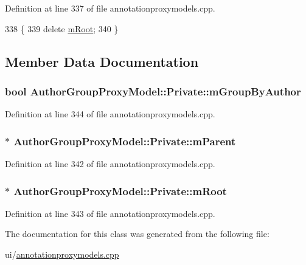 Definition at line 337 of file annotationproxymodels.\+cpp.


\begin{DoxyCode}
338         \{
339             \textcolor{keyword}{delete} \hyperlink{classAuthorGroupProxyModel_1_1Private_ac1023558be5adf141219d8be245ba47d}{mRoot};
340         \}
\end{DoxyCode}


\subsection{Member Data Documentation}
\hypertarget{classAuthorGroupProxyModel_1_1Private_ac8adbcccfaac17175553d92cdb90dae0}{
\subsubsection[{m\+Group\+By\+Author}]{\setlength{\rightskip}{0pt plus 5cm}bool Author\+Group\+Proxy\+Model\+::\+Private\+::m\+Group\+By\+Author}}\label{classAuthorGroupProxyModel_1_1Private_ac8adbcccfaac17175553d92cdb90dae0}


Definition at line 344 of file annotationproxymodels.\+cpp.

\hypertarget{classAuthorGroupProxyModel_1_1Private_a307f45d20a7e166fcf26489b35fc3164}{
\subsubsection[{m\+Parent}]{$\ast$ Author\+Group\+Proxy\+Model\+::\+Private\+::m\+Parent}}\label{classAuthorGroupProxyModel_1_1Private_a307f45d20a7e166fcf26489b35fc3164}


Definition at line 342 of file annotationproxymodels.\+cpp.

\hypertarget{classAuthorGroupProxyModel_1_1Private_ac1023558be5adf141219d8be245ba47d}{
\subsubsection[{m\+Root}]{$\ast$ Author\+Group\+Proxy\+Model\+::\+Private\+::m\+Root}}\label{classAuthorGroupProxyModel_1_1Private_ac1023558be5adf141219d8be245ba47d}


Definition at line 343 of file annotationproxymodels.\+cpp.



The documentation for this class was generated from the following file\+:\begin{DoxyCompactItemize}
\item 
ui/\hyperlink{annotationproxymodels_8cpp}{annotationproxymodels.\+cpp}\end{DoxyCompactItemize}
